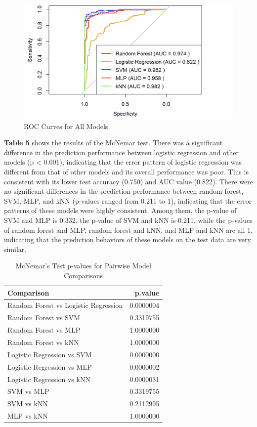 \documentclass[
  doc]{apa6}
\begin{document}
\begin{figure}[H]

{\centering \includegraphics[width=0.85\linewidth]{figure/6} 

}

\caption{ROC Curves for All Models}\label{fig:unnamed-chunk-7}
\end{figure}

\newpage

\textbf{Table 5} shows the results of the McNemar test. There was a significant difference in the prediction performance between logistic regression and other models (p \textless{} 0.001), indicating that the error pattern of logistic regression was different from that of other models and its overall performance was poor. This is consistent with its lower test accuracy (0.750) and AUC value (0.822). There were no significant differences in the prediction performance between random forest, SVM, MLP, and kNN (p-values ranged from 0.211 to 1), indicating that the error patterns of these models were highly consistent. Among them, the p-value of SVM and MLP is 0.332, the p-value of SVM and kNN is 0.211, while the p-values of random forest and MLP, random forest and kNN, and MLP and kNN are all 1, indicating that the prediction behaviors of these models on the test data are very similar.

\begin{table}[!h]
\centering
\caption{\label{tab:unnamed-chunk-8}McNemar's Test p-values for Pairwise Model Comparisons}
\centering
\begin{tabular}[t]{l|r}
\hline
Comparison & p.value\\
\hline
Random Forest vs Logistic Regression & 0.0000004\\
\hline
Random Forest vs SVM & 0.3319755\\
\hline
Random Forest vs MLP & 1.0000000\\
\hline
Random Forest vs kNN & 1.0000000\\
\hline
Logistic Regression vs SVM & 0.0000000\\
\hline
Logistic Regression vs MLP & 0.0000002\\
\hline
Logistic Regression vs kNN & 0.0000031\\
\hline
SVM vs MLP & 0.3319755\\
\hline
SVM vs kNN & 0.2112995\\
\hline
MLP vs kNN & 1.0000000\\
\hline
\end{tabular}
\end{table}
\end{document}
